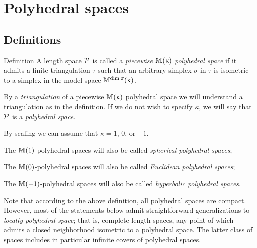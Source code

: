 \chapter{Polyhedral spaces}

\section{Definitions}

\begin{thm}{Definition}\label{def:poly}
A length space $\mathcal{P}$ is called a
\emph{piecewise $\mathbb{M}_{{}}^{}({\upkappa})$ polyhedral space} 
if it admits a finite triangulation $\tau$ 
such that an arbitrary simplex $\sigma$ in $\tau$ is isometric to a simplex in the model space $\mathbb{M}_{{}}^{\mathop{\rm dim}\nolimits \upsigma}({\upkappa})$.

By a 
\emph{triangulation} of a piecewise
$\mathbb{M}_{{}}^{}({\upkappa})$ polyhedral space 
we will understand a triangulation as in the definition.
If we do not wish to specify $\kappa$, we will say that $\mathcal{P}$ is a \emph{polyhedral space}. 

By scaling we can assume that $\kappa=1$, $0$, or $-1$.
\begin{subthm}{}
The $\mathbb{M}_{{}}^{}({1})$-polyhedral spaces will also be 
called 
\emph{spherical polyhedral spaces};
\end{subthm}

\begin{subthm}{}
The $\mathbb{M}_{{}}^{}({0})$-polyhedral spaces will also be 
called 
\emph{Euclidean polyhedral spaces};
\end{subthm}

\begin{subthm}{}
The $\mathbb{M}_{{}}^{}({-1})$-polyhedral spaces will also be 
called 
\emph{hyperbolic polyhedral spaces}.
\end{subthm}
\end{thm}

Note that according to the above definition,
all polyhedral spaces are compact.
However, 
most of the statements below admit straightforward generalizations 
to \emph{locally polyhedral space};
that is, complete length spaces,  
any point of which admits a closed neighborhood isometric to a polyhedral space.
The latter class of spaces includes in particular  infinite covers of polyhedral spaces.

